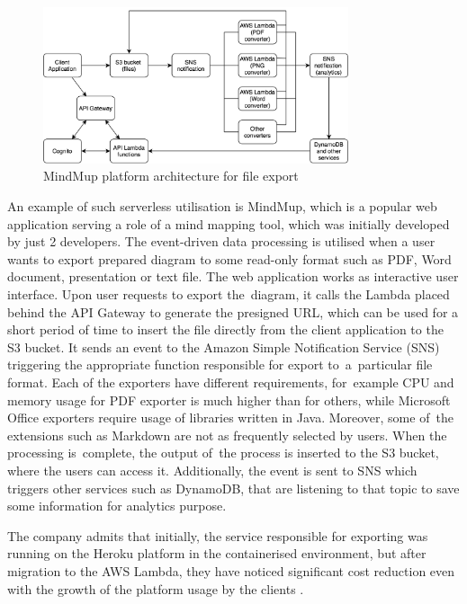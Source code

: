 \begin{figure}[h]
    \centering
    \includegraphics[width=0.8\textwidth]{assets/02-serverless/MindMupArchitecture.png}
    \caption{MindMup platform architecture for file export}
    \label{fig:mindmup-architecture-diagram}
\end{figure}

An example of such serverless utilisation is MindMup, which is a popular web application serving a role of a mind mapping tool, which was initially developed by just 2 developers. The event-driven data processing is utilised when a user wants to export prepared diagram to some read-only format such as PDF, Word document, presentation or text file. The web application works as interactive user interface. Upon user requests to export the~diagram, it calls the Lambda placed behind the API Gateway to generate the presigned URL, which can be used for a short period of time to insert the file directly from the client application to the S3 bucket. It sends an event to the Amazon Simple Notification Service (SNS) triggering the appropriate function responsible for export to~a~particular file format. Each of the exporters have different requirements, for~example CPU and memory usage for PDF exporter is much higher than for others, while Microsoft Office exporters require usage of libraries written in Java. Moreover, some of~the extensions such as Markdown are not as frequently selected by users. When the processing is~complete, the output of~the process is inserted to the S3 bucket, where the users can access it. Additionally, the event is sent to SNS which triggers other services such as DynamoDB, that are listening to that topic to save some information for analytics purpose.

The company admits that initially, the service responsible for exporting was running on the Heroku platform in the containerised environment, but after migration to the AWS Lambda, they have noticed significant cost reduction even with the growth of the platform usage by the clients \cite{ServerlessApplicationsWithNodejs}.

